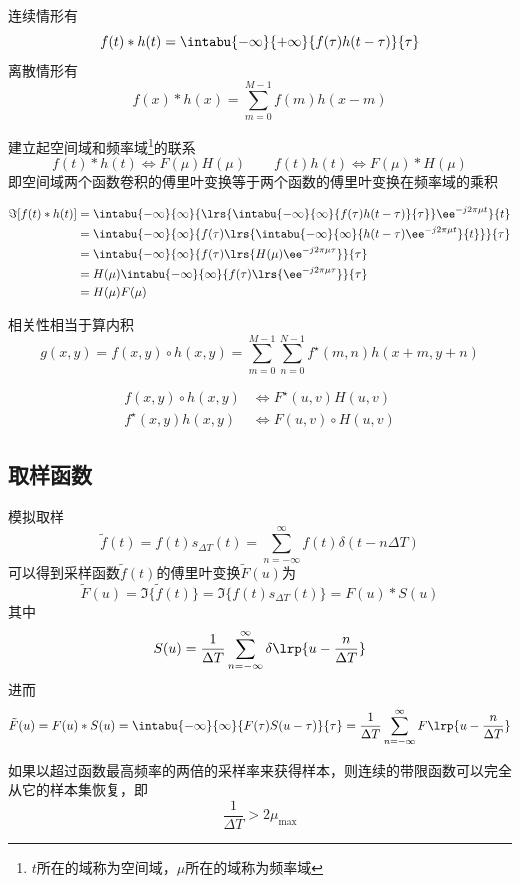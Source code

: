 \begin{definition}[卷积]
连续情形有
\[f(t)*h(t)=\intabu{-\infty}{+\infty}{f(\tau)h(t-\tau)}{\tau}\]
离散情形有
\[f(x)*h(x)=\sum_{m=0}^{M-1}f(m)h(x-m)\]
\end{definition}
\begin{theorem}[卷积定理]
建立起空间域和频率域\footnote{$t$所在的域称为空间域，$\mu$所在的域称为频率域}的联系
\[f(t)*h(t)\iff F(\mu)H(\mu)
\qquad
f(t)h(t)\iff F(\mu)*H(\mu)\]
即空间域两个函数卷积的傅里叶变换等于两个函数的傅里叶变换在频率域的乘积
\end{theorem}
\begin{analysis}
\[\begin{aligned}
\Im[f(t)*h(t)]&=\intabu{-\infty}{\infty}{\lrs{\intabu{-\infty}{\infty}{f(\tau)h(t-\tau)}{\tau}}\ee^{-j2\pi\mu t}}{t}\\
&=\intabu{-\infty}{\infty}{f(\tau)\lrs{\intabu{-\infty}{\infty}{h(t-\tau)\ee^{-j2\pi\mu t}}{t}}}{\tau}\\
&=\intabu{-\infty}{\infty}{f(\tau)\lrs{H(\mu)\ee^{-j2\pi\mu\tau}}}{\tau}\\
&=H(\mu)\intabu{-\infty}{\infty}{f(\tau)\lrs{\ee^{-j2\pi\mu\tau}}}{\tau}\\
&=H(\mu)F(\mu)
\end{aligned}\]
\end{analysis}

\begin{definition}[相关]
相关性相当于算内积
\[g(x,y)=f(x,y)\circ h(x,y)=\sum_{m=0}^{M-1}\sum_{n=0}^{N-1}f^\star(m,n)h(x+m,y+n)\]
\end{definition}
\begin{theorem}[相关定理]
\[\begin{aligned}
f(x,y)\circ h(x,y)&\iff F^\star(u,v)H(u,v)\\
f^\star(x,y)h(x,y)&\iff F(u,v)\circ H(u,v)
\end{aligned}\]
\end{theorem}

\subsection{取样函数}
模拟取样
\[\tilde{f}(t)=f(t)s_{\Delta T}(t)=\sum_{n=-\infty}^\infty f(t)\delta(t-n\Delta T)\]
可以得到采样函数$\tilde{f}(t)$的傅里叶变换$\tilde{F}(u)$为
\[\tilde{F}(u)=\Im\{\tilde{f}(t)\}=\Im\{f(t)s_{\Delta T}(t)\}=F(u)*S(u)\]
其中
\[S(u)=\frac{1}{\Delta T}\sum_{n=-\infty}^{\infty}\delta\lrp{u-\frac{n}{\Delta T}}\]
进而
\[\tilde{F}(u)=F(u)*S(u)=\intabu{-\infty}{\infty}{F(\tau)S(u-\tau)}{\tau}=\frac{1}{\Delta T}\sum_{n=-\infty}^{\infty}F\lrp{u-\frac{n}{\Delta T}}\]
\begin{theorem}
如果以超过函数最高频率的两倍的采样率来获得样本，则连续的带限函数可以完全从它的样本集恢复，即
\[\frac{1}{\Delta T}>2\mu_{\max}\]
\end{theorem}

